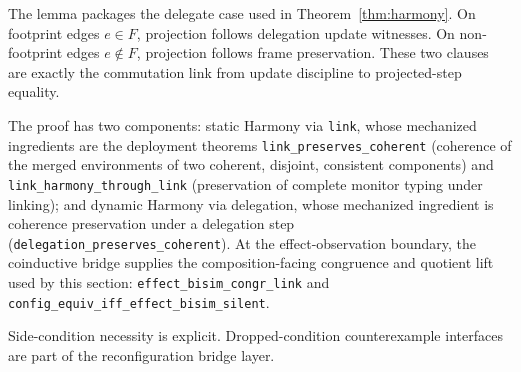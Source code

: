 \documentclass[a4paper,10pt,twocolumn,english]{article}
\numberwithin{equation}{section}
\theoremstyle{paperdef}
\theoremstyle{paperplain}
\theoremstyle{paperdef}
\theoremstyle{paperremark}
\theoremstyle{paperdef}
\begin{document}
The lemma packages the delegate case used in Theorem~\ref{thm:harmony}. On footprint edges $e\in F$, projection follows delegation update witnesses. On non-footprint edges $e\notin F$, projection follows frame preservation. These two clauses are exactly the commutation link from update discipline to projected-step equality.

The proof has two components: static Harmony via \texttt{link}, whose mechanized ingredients are the deployment theorems \nolinkurl{link_preserves_coherent} (coherence of the merged environments of two coherent, disjoint, consistent components) and \nolinkurl{link_harmony_through_link} (preservation of complete monitor typing under linking); and dynamic Harmony via delegation, whose mechanized ingredient is coherence preservation under a delegation step (\nolinkurl{delegation_preserves_coherent}). At the effect-observation boundary, the coinductive bridge supplies the composition-facing
congruence and quotient lift used by this section: \nolinkurl{effect_bisim_congr_link} and
\nolinkurl{config_equiv_iff_effect_bisim_silent}.

Side-condition necessity is explicit. Dropped-condition counterexample interfaces are part
of the reconfiguration bridge layer.
\end{document}
